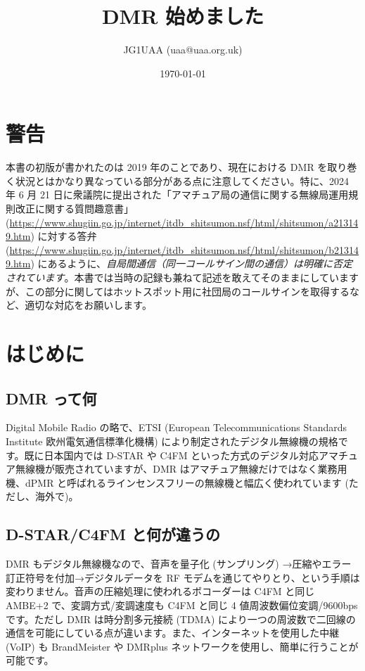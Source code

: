 \documentclass[a4j,oneside]{ujbook}
\begin{document}
\title{DMR 始めました}
\author{JG1UAA (uaa@uaa.org.uk)}
\date{\today}

\maketitle
\tableofcontents

\chapter*{警告}

本書の初版が書かれたのは 2019 年のことであり、現在における DMR を取り巻く状況とはかなり異なっている部分がある点に注意してください。特に、2024 年 6 月 21 日に衆議院に提出された「アマチュア局の通信に関する無線局運用規則改正に関する質問趣意書」 (\url{https://www.shugiin.go.jp/internet/itdb_shitsumon.nsf/html/shitsumon/a213149.htm}) に対する答弁 (\url{https://www.shugiin.go.jp/internet/itdb_shitsumon.nsf/html/shitsumon/b213149.htm}) にあるように、\emph{自局間通信（同一コールサイン間の通信）は明確に否定されています}。本書では当時の記録も兼ねて記述を敢えてそのままにしていますが、この部分に関してはホットスポット用に社団局のコールサインを取得するなど、適切な対応をお願いします。

\chapter{はじめに}

\section{DMR って何}

Digital Mobile Radio の略で、ETSI (European Telecommunications Standards Institute 欧州電気通信標準化機構) により制定されたデジタル無線機の規格です。既に日本国内では D-STAR や C4FM といった方式のデジタル対応アマチュア無線機が販売されていますが、DMR はアマチュア無線だけではなく業務用機、dPMR と呼ばれるラインセンスフリーの無線機と幅広く使われています (ただし、海外で)。

\section{D-STAR/C4FM と何が違うの}

DMR もデジタル無線機なので、音声を量子化 (サンプリング) →圧縮やエラー訂正符号を付加→デジタルデータを RF モデムを通じてやりとり、という手順は変わりません。音声の圧縮処理に使われるボコーダーは C4FM と同じ AMBE+2 で、変調方式/変調速度も C4FM と同じ 4 値周波数偏位変調/9600bps です。ただし DMR は時分割多元接続 (TDMA) により一つの周波数で二回線の通信を可能にしている点が違います。また、インターネットを使用した中継 (VoIP) も BrandMeister や DMRplus ネットワークを使用し、簡単に行うことが可能です。
\end{document}

